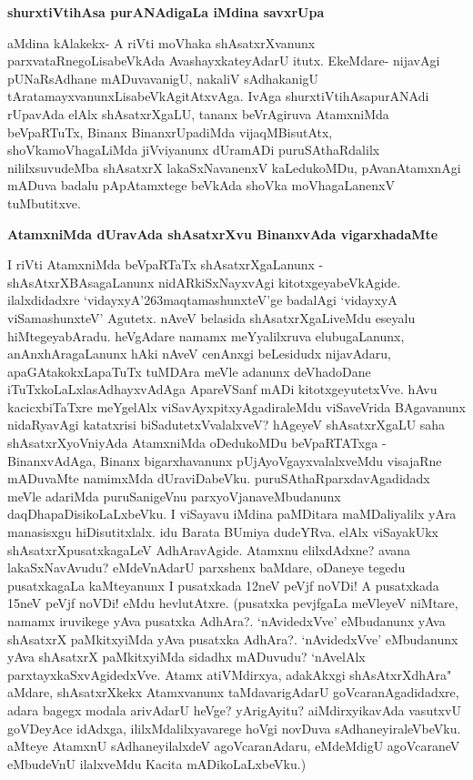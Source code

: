 {\bf shurxtiVtihAsa purANAdigaLa iMdina savxrUpa}

aMdina kAlakekx- A riVti moVhaka shAsatxrXvanunx parxvataRnegoLisabeVkAda AvashayxkateyAdarU itutx. EkeMdare- nijavAgi pUNaRsAdhane mADuvavanigU, nakaliV sAdhakanigU tAratamayxvanunxLisabeVkAgitAtxvAga. IvAga shurxtiVtihAsapurANAdi rUpavAda elAlx shAsatxrXgaLU, tananx beVrAgiruva AtamxniMda beVpaRTuTx, Binanx BinanxrUpadiMda vijaqMBisutAtx, shoVkamoVhagaLiMda jiVviyanunx dUramADi puruSAthaRdalilx nililxsuvudeMba shAsatxrX lakaSxNavanenxV kaLedukoMDu, pAvanAtamxnAgi mADuva badalu pApAtamxtege beVkAda shoVka moVhagaLanenxV tuMbutitxve.

{\bf AtamxniMda dUravAda shAsatxrXvu BinanxvAda vigarxhadaMte}

I riVti AtamxniMda beVpaRTaTx shAsatxrXgaLanunx - shAsAtxrXBAsagaLanunx nidARkiSxNayxvAgi kitotxgeyabeVkAgide. ilalxdidadxre `vidayxyA\char'263maqtamashunxteV'ge badalAgi `vidayxyA viSamashunxteV' Agutetx. nAveV belasida shAsatxrXgaLiveMdu eseyalu hiMtegeyabAradu. heVgAdare namamx meYyalilxruva elubugaLanunx, anAnxhAragaLanunx hAki nAveV cenAnxgi beLesidudx nijavAdaru, apaGAtakokxLapaTuTx tuMDAra meVle adanunx deVhadoDane iTuTxkoLaLxlasAdhayxvAdAga ApareVSanf mADi kitotxgeyutetxVve. hAvu kacicxbiTaTxre meYgelAlx viSavAyxpitxyAgadiraleMdu viSaveVrida BAgavanunx nidaRyavAgi katatxrisi biSadutetxVvalalxveV? hAgeyeV shAsatxrXgaLU saha shAsatxrXyoVniyAda AtamxniMda oDedukoMDu beVpaRTATxga - BinanxvAdAga, Binanx bigarxhavanunx pUjAyoVgayxvalalxveMdu visajaRne mADuvaMte namimxMda dUraviDabeVku. puruSAthaRparxdavAgadidadx meVle adariMda puruSanigeVnu parxyoVjanaveMbudanunx daqDhapaDisikoLaLxbeVku. I viSayavu iMdina paMDitara maMDaliyalilx yAra manasisxgu hiDisutitxlalx. idu Barata BUmiya dudeYRva. elAlx viSayakUkx shAsatxrXpusatxkagaLeV AdhAravAgide. Atamxnu elilxdAdxne? avana lakaSxNavAvudu? eMdeVnAdarU parxshenx baMdare, oDaneye tegedu pusatxkagaLa kaMteyanunx I pusatxkada 12neV peVjf noVDi! A pusatxkada 15neV peVjf noVDi! eMdu hevlutAtxre. (pusatxka pevjfgaLa meVleyeV niMtare, namamx iruvikege yAva pusatxka AdhAra?. `nAvidedxVve' eMbudanunx yAva shAsatxrX paMkitxyiMda yAva pusatxka AdhAra?. `nAvidedxVve' eMbudanunx yAva shAsatxrX paMkitxyiMda sidadhx mADuvudu? `nAvelAlx parxtayxkaSxvAgidedxVve. Atamx atiVMdirxya, adakAkxgi shAsAtxrXdhAra" aMdare, shAsatxrXkekx Atamxvanunx taMdavarigAdarU goVcaranAgadidadxre, adara bagegx modala arivAdarU heVge? yArigAyitu? aiMdirxyikavAda vasutxvU goVDeyAce idAdxga, ililxMdalilxyavarege hoVgi novDuva sAdhaneyiraleVbeVku. aMteye AtamxnU sAdhaneyilalxdeV agoVcaranAdaru, eMdeMdigU agoVcaraneV eMbudeVnU ilalxveMdu Kacita mADikoLaLxbeVku.)

